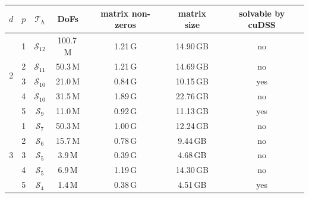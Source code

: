 \begin{tabular}{rrcS[table-format=3.1\,M]S[table-format=1.2\,G]S[table-format=2.2\,GB]c}
\toprule
$d$ & $p$ & $\mathcal{T}_h$ & {DoFs} & {matrix non-zeros} & {matrix size} & solvable by cuDSS  \\
\midrule
{} & 1 & $\mathcal{S}_{12}$ & 100.7\,{M} & 1.21\,{G} & 14.90\,{GB} & no \\
 & 2 & $\mathcal{S}_{11}$ & 50.3\,{M} & 1.21\,{G} & 14.69\,{GB} & no \\
 & 3 & $\mathcal{S}_{10}$ & 21.0\,{M} & 0.84\,{G} & 10.15\,{GB} & yes \\
 & 4 & $\mathcal{S}_{10}$ & 31.5\,{M} & 1.89\,{G} & 22.76\,{GB} & no \\
 & 5 & $\mathcal{S}_{9}$ & 11.0\,{M} & 0.92\,{G} & 11.13\,{GB} & yes \\
 & 1 & $\mathcal{S}_{7}$ & 50.3\,{M} & 1.00\,{G} & 12.24\,{GB} & no \\
 & 2 & $\mathcal{S}_{6}$ & 15.7\,{M} & 0.78\,{G} & 9.44\,{GB} & no \\
 & 3 & $\mathcal{S}_{5}$ & 3.9\,{M} & 0.39\,{G} & 4.68\,{GB} & no \\
 & 4 & $\mathcal{S}_{5}$ & 6.9\,{M} & 1.19\,{G} & 14.30\,{GB} & no \\
 & 5 & $\mathcal{S}_{4}$ & 1.4\,{M} & 0.38\,{G} & 4.51\,{GB} & yes \\
\bottomrule
\end{tabular}

